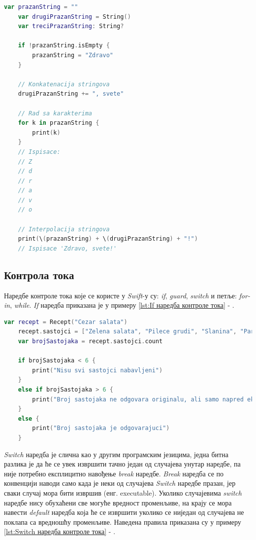 \documentclass[12pt,oneside]{memoir}
\begin{document}
\begin{lstlisting}[caption=\textit{{Операције над стринговима}}, label={lst:Операције над стринговима}, language=Swift, frame=single]
    var prazanString = ""
    var drugiPrazanString = String()
    var treciPrazanString: String?
    
    if !prazanString.isEmpty {
        prazanString = "Zdravo"
    }
    
    // Konkatenacija stringova
    drugiPrazanString += ", svete"
    
    // Rad sa karakterima
    for k in prazanString {
        print(k)
    }
    // Ispisace: 
    // Z
    // d
    // r
    // a
    // v
    // o
    
    // Interpolacija stringova
    print(\(prazanString) + \(drugiPrazanString) + "!")
    // Ispisace 'Zdravo, svete!'
\end{lstlisting}

\subsection{Контрола тока}

\indent Наредбе контроле тока које се користе у \textit{Swift}-у су: \textit{if}, \textit{guard}, \textit{switch} и петље: \textit{for-in}, \textit{while}. \textit{If} наредба приказана је у примеру \ref{lst:If наредба контроле тока} - .

\begin{lstlisting}[caption=\textit{{If наредбa контроле тока}}, label={lst:If наредба контроле тока}, language=Swift, frame=single]
    var recept = Recept("Cezar salata")
    recept.sastojci = ["Zelena salata", "Pilece grudi", "Slanina", "Paradajz", "Hleb", "Cezar premaz"]
    var brojSastojaka = recept.sastojci.count
    
    if brojSastojaka < 6 {
        print("Nisu svi sastojci nabavljeni")
    }
    else if brojSastojaka > 6 {
        print("Broj sastojaka ne odgovara originalu, ali samo napred eksperimentisi")
    }
    else {
        print("Broj sastojaka je odgovarajuci")
    }
\end{lstlisting}

\indent \textit{Switch} наредба је слична као у другим програмским језицима, једна битна разлика је да ће се увек извршити тачно један од случајева унутар наредбе, па није потребно експлицитно навођење \textit{break} наредбе. \textit{Break} наредба се по конвенцији наводи само када је неки од случајева \textit{Switch} наредбе празан, јер сваки случај мора бити извршив (енг. executable). Уколико случајевима \textit{switch} наредбе нису обухаћени све могуће вредност променљиве, на крају се мора навести \textit{default} наредба која ће се извршити уколико се ниједан од случајева не поклапа са вредношћу променљиве.  Наведена правила приказана су у примеру \ref{lst:Switch наредба контроле тока} - .
\end{document}
